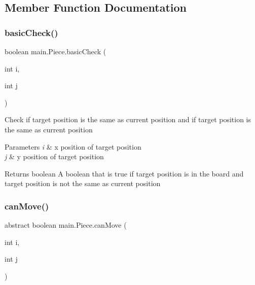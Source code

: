 \subsection{Member Function Documentation}
\mbox{\label{classmain_1_1_piece_a570604f7be083379527fc650508af42c}} 
\subsubsection{\texorpdfstring{basicCheck()}{basicCheck()}}
{\footnotesize\ttfamily boolean main.\+Piece.\+basic\+Check (\begin{DoxyParamCaption}\item[{int}]{i,  }\item[{int}]{j }\end{DoxyParamCaption})\hspace{0.3cm}{\ttfamily [inline]}}

Check if target position is the same as current position and if target position is the same as current position


\begin{DoxyParams}{Parameters}
{\em i} & x position of target position \\
\hline
{\em j} & y position of target position \\
\hline
\end{DoxyParams}
\begin{DoxyReturn}{Returns}
boolean A boolean that is true if target position is in the board and target position is not the same as current position 
\end{DoxyReturn}
\mbox{\label{classmain_1_1_piece_a9f8dae1041fa90c31e2e54cd8a592bec}} 
\subsubsection{\texorpdfstring{canMove()}{canMove()}}
{\footnotesize\ttfamily abstract boolean main.\+Piece.\+can\+Move (\begin{DoxyParamCaption}\item[{int}]{i,  }\item[{int}]{j }\end{DoxyParamCaption})\hspace{0.3cm}{\ttfamily [abstract]}}

